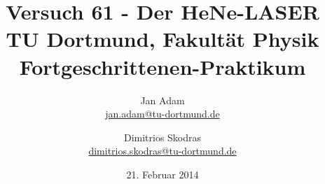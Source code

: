 



\title{Versuch 61 - Der HeNe-LASER\\				%
\large TU Dortmund, Fakultät Physik\\ 
\normalsize Fortgeschrittenen-Praktikum}

\author{Jan Adam\\			%
{\small \href{jan.adam@tu-dortmund.de}{jan.adam@tu-dortmund.de}}	%
\and						%
Dimitrios Skodras\\					%
{\small \href{dimitrios.skodras@tu-dortmund.de}{dimitrios.skodras@tu-dortmund.de}}		%
}
\date{21. Februar 2014}				%





\maketitle					%
\thispagestyle{empty} 				%



\tableofcontents


\newpage					%


